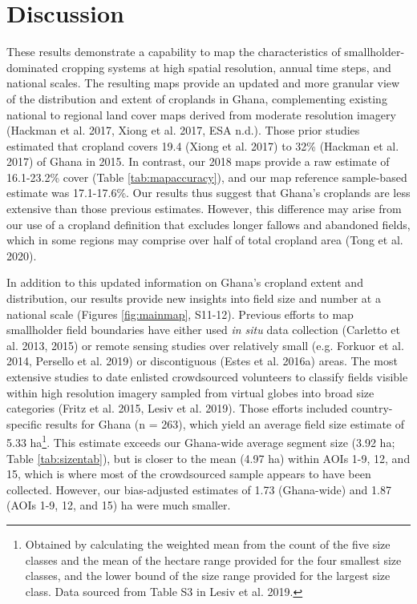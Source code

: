 \documentclass[11pt,a4paper]{article}
\begin{document}
\hypertarget{discussion}{%
\section{Discussion}\label{discussion}}

These results demonstrate a capability to map the characteristics of
smallholder-dominated cropping systems at high spatial resolution,
annual time steps, and national scales. The resulting maps provide an
updated and more granular view of the distribution and extent of
croplands in Ghana, complementing existing national to regional land
cover maps derived from moderate resolution imagery (Hackman et al.
2017, Xiong et al. 2017, ESA n.d.). Those prior studies estimated that
cropland covers 19.4 (Xiong et al. 2017) to 32\% (Hackman et al. 2017)
of Ghana in 2015. In contrast, our 2018 maps provide a raw estimate of
16.1-23.2\% cover (Table \ref{tab:mapaccuracy}), and our map reference
sample-based estimate was 17.1-17.6\%. Our results thus suggest that
Ghana's croplands are less extensive than those previous estimates.
However, this difference may arise from our use of a cropland definition
that excludes longer fallows and abandoned fields, which in some regions
may comprise over half of total cropland area (Tong et al. 2020).

In addition to this updated information on Ghana's cropland extent and
distribution, our results provide new insights into field size and
number at a national scale (Figures \ref{fig:mainmap}, S11-12). Previous
efforts to map smallholder field boundaries have either used \emph{in
situ} data collection (Carletto et al. 2013, 2015) or remote sensing
studies over relatively small (e.g. Forkuor et al. 2014, Persello et al.
2019) or discontiguous (Estes et al. 2016a) areas. The most extensive
studies to date enlisted crowdsourced volunteers to classify fields
visible within high resolution imagery sampled from virtual globes into
broad size categories (Fritz et al. 2015, Lesiv et al. 2019). Those
efforts included country-specific results for Ghana (n = 263), which
yield an average field size estimate of 5.33
ha\footnote{Obtained by calculating the weighted mean from the count of the five size classes and the mean of the hectare range provided for the four smallest size classes, and the lower bound of the size range provided for the largest size class. Data sourced from Table S3 in Lesiv et al. 2019.}.
This estimate exceeds our Ghana-wide average segment size (3.92 ha;
Table \ref{tab:sizentab}), but is closer to the mean (4.97 ha) within
AOIs 1-9, 12, and 15, which is where most of the crowdsourced sample
appears to have been collected. However, our bias-adjusted estimates of
1.73 (Ghana-wide) and 1.87 (AOIs 1-9, 12, and 15) ha were much smaller.
\end{document}
